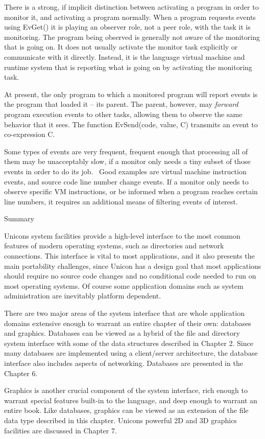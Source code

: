 There is a strong, if implicit distinction between activating a program
in order to monitor it, and activating a program normally. When a
program requests events using \textsf{EvGet()} it is playing an
observer role, not a peer role, with the task it is monitoring. The
program being observed is generally not aware of the monitoring that is
going on. It does not usually activate the monitor task explicitly or
communicate with it directly. Instead, it is the language virtual
machine and runtime system that is reporting what is going on by
activating the monitoring task.

At present, the only program to which a monitored program will report
events is the program that loaded it -- its parent. The parent,
however, may \textit{forward} program execution events to other tasks,
allowing them to observe the same behavior that it sees. The function
\textsf{EvSend(code, value, C)} transmits an event to co-expression
\textsf{C}.

Some types of events are very frequent, frequent enough that processing
all of them may be unacceptably slow, if a monitor only needs a tiny
subset of those events in order to do its job. \ Good examples are
virtual machine instruction events, and source code line number change
events. If a monitor only needs to observe specific VM instructions, or
be informed when a program reaches certain line numbers, it requires an
additional means of filtering events of interest.

{\sffamily
Summary}

Unicon{\textquotesingle}s system facilities provide a high-level
interface to the most common features of modern operating systems, such
as directories and network connections. This interface is vital to most
applications, and it also presents the main portability challenges,
since Unicon has a design goal that most applications should require no
source code changes and no conditional code needed
to run on most operating systems. Of course some application domains
such as system administration are inevitably platform dependent.

There are two major areas of the system interface that are whole
application domains extensive enough to warrant an entire chapter of
their own: databases and graphics. Databases can be
viewed as a hybrid of the file and directory system interface with some
of the data structures described in Chapter 2. Since many databases are
implemented using a client/server architecture, the database interface
also includes aspects of networking. Databases are presented in the
Chapter 6.

Graphics is another crucial component of the system interface, rich
enough to warrant special features built-in to the language, and deep
enough to warrant an entire book. Like databases, graphics can be
viewed as an extension of the file data type described in this chapter.
Unicon{\textquotesingle}s powerful 2D and 3D graphics facilities are
discussed in Chapter 7.

